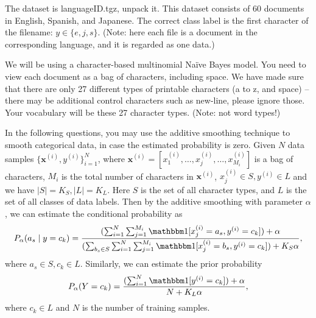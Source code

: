 \documentclass[10pt]{article}
\theoremstyle{definition}
\newcommand{\vc}[1]{\boldsymbol{#1}}
\def\ind{\mathbbm 1}
\begin{document}
The dataset is languageID.tgz, unpack it. This dataset consists of 60 documents in English, Spanish, and Japanese. The correct class label is the first character of the filename: $y \in \{e, j, s\}$. (Note: here each file is a document in the corresponding language, and it is regarded as one data.)

We will be using a character-based multinomial Naïve Bayes model. You need to view each document as a bag of characters, including space. We have made sure that there are only 27 different types of printable characters (a to z, and space) -- there may be additional control characters such as new-line, please ignore those. Your vocabulary will be these 27 character types. (Note: not word types!)

In the following questions, you may use the additive smoothing technique to smooth categorical data, in case the estimated probability is zero. Given $N$ data samples $\{\vc{x}^{(i)}, y^{(i)}\}_{i = 1}^{N}$, where $\vc{x}^{(i)} = [x_1^{(i)}, \dots, x_j^{(i)}, \dots, x_{M_i}^{(i)}]$ is a bag of characters, $M_i$ is the total number of characters in $\vc{x}^{(i)}$, $x_{j}^{(i)} \in S, y^{(i)} \in L$ and we have $|S| = K_S, |L| = K_L$. Here $S$ is the set of all character types, and $L$ is the set of all classes of data labels. Then by the additive smoothing with parameter $\alpha$, we can estimate the conditional probability as
$$
    P_{\alpha}(a_s \mid y = c_k) = \frac{(\sum_{i = 1}^{N}\sum_{j = 1}^{M_i}\ind [x_{j}^{(i)} = a_s, y^{(i)} = c_k]) + \alpha}{(\sum_{b_s \in S}\sum_{i = 1}^{N}\sum_{j = 1}^{M_i}\ind [x_{j}^{(i)} = b_s, y^{(i)} = c_k]) + K_S \alpha},
$$
where $a_s \in S, c_k \in L$. Similarly, we can estimate the prior probability
$$
    P_{\alpha}(Y = c_k) = \frac{(\sum_{i = 1}^{N}\ind [y^{(i)} = c_k]) + \alpha}{N + K_L \alpha},
$$
where $c_k \in L$ and $N$ is the number of training samples.
\end{document}
